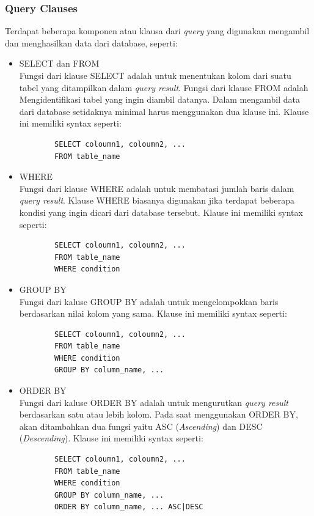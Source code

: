 \subsubsection{Query Clauses}
Terdapat beberapa komponen atau klausa dari \textit{query} yang digunakan mengambil dan menghasilkan data dari database, seperti:
\begin{itemize}
	\item SELECT dan FROM\\
	Fungsi dari klause SELECT adalah untuk menentukan kolom dari suatu tabel yang ditampilkan dalam \textit{query result}. Fungsi dari klause FROM adalah Mengidentifikasi tabel yang ingin diambil datanya. Dalam mengambil data dari database setidaknya minimal harus menggunakan dua klause ini. Klause ini memiliki syntax seperti:
	\begin{verbatim}
		SELECT coloumn1, coloumn2, ...
		FROM table_name
	\end{verbatim}
	
	\item WHERE\\
	Fungsi dari klause WHERE adalah untuk membatasi jumlah baris dalam \textit{query result}. Klause WHERE biasanya digunakan jika terdapat beberapa kondisi yang ingin dicari dari database tersebut. Klause ini memiliki syntax seperti:
	\begin{verbatim}
		SELECT coloumn1, coloumn2, ...
		FROM table_name
		WHERE condition
	\end{verbatim}
	
	\item GROUP BY\\
	Fungsi dari kaluse GROUP BY adalah untuk mengelompokkan baris berdasarkan nilai kolom yang sama. Klause ini memiliki syntax seperti:
	\begin{verbatim}
		SELECT coloumn1, coloumn2, ...
		FROM table_name
		WHERE condition
		GROUP BY column_name, ...
	\end{verbatim}
	
	\item ORDER BY\\
	Fungsi dari kaluse ORDER BY adalah untuk mengurutkan \textit{query result} berdasarkan satu atau lebih kolom. Pada saat menggunakan ORDER BY, akan ditambahkan dua fungsi yaitu ASC (\textit{Ascending}) dan DESC (\textit{Descending}). Klause ini memiliki syntax seperti:
	\begin{verbatim}
		SELECT coloumn1, coloumn2, ...
		FROM table_name
		WHERE condition
		GROUP BY column_name, ...
		ORDER BY column_name, ... ASC|DESC
	\end{verbatim}
\end{itemize}



